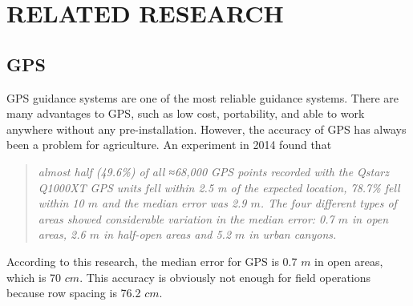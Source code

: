 \chapter{RELATED RESEARCH}

\section{GPS}
GPS guidance systems are one of the most reliable guidance systems. There are many advantages to GPS, such as low cost, portability, and able to work anywhere without any pre-installation. However, the accuracy of GPS has always been a problem for agriculture. An experiment in 2014 found that 
\begin{quote}
\textit{almost half (49.6\%) of all ≈68,000 GPS points recorded with the Qstarz Q1000XT GPS units fell within 2.5 m of the expected location, 78.7\% fell within 10 $m$ and the median error was 2.9 $m$. The four different types of areas showed considerable variation in the median error: 0.7 $m$ in open areas, 2.6 $m$ in half-open areas and 5.2 $m$ in urban canyons.} \cite{schipperijn2014dynamic}
\end{quote}
According to this research, the median error for GPS is 0.7 $m$ in open areas, which is 70 $cm$. This accuracy is obviously not enough for field operations because row spacing is 76.2 $cm$.

